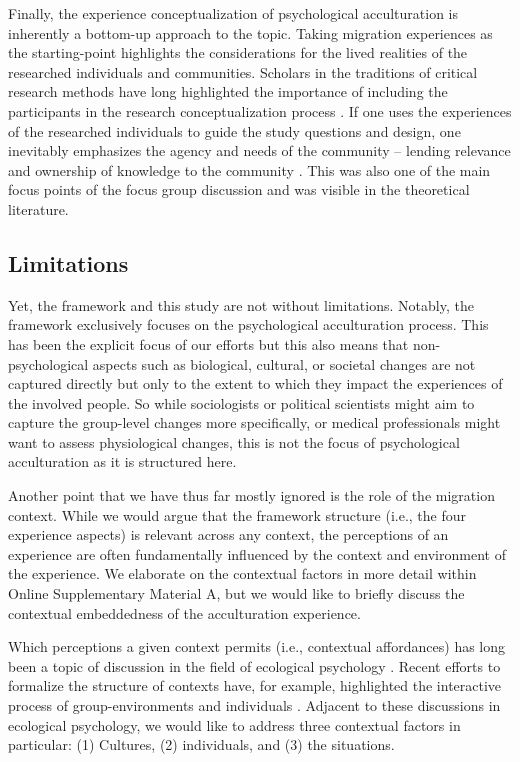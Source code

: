 \documentclass[man, 12pt, a4paper]{apa7}
\begin{document}
Finally, the experience conceptualization of psychological acculturation is inherently a bottom-up approach to the topic. Taking migration experiences as the starting-point highlights the considerations for the lived realities of the researched individuals and communities. Scholars in the traditions of critical research methods have long highlighted the importance of including the participants in the research conceptualization process \citep[e.g.,][]{Kovach2009}. If one uses the experiences of the researched individuals to guide the study questions and design, one inevitably emphasizes the agency and needs of the community -- lending relevance and ownership of knowledge to the community \citep[e.g., ][]{Schmidt2021}. This was also one of the main focus points of the focus group discussion and was visible in the theoretical literature.

\subsection{Limitations}
Yet, the framework and this study are not without limitations. Notably, the framework exclusively focuses on the psychological acculturation process. This has been the explicit focus of our efforts but this also means that non-psychological aspects such as biological, cultural, or societal changes are not captured directly but only to the extent to which they impact the experiences of the involved people. So while sociologists or political scientists might aim to capture the group-level changes more specifically, or medical professionals might want to assess physiological changes, this is not the focus of psychological acculturation as it is structured here. 

Another point that we have thus far mostly ignored is the role of the migration context. While we would argue that the framework structure (i.e., the four experience aspects) is relevant across any context, the perceptions of an experience are often fundamentally influenced by the context and environment of the experience. We elaborate on the contextual factors in more detail within Online Supplementary Material A, but we would like to briefly discuss the contextual embeddedness of the acculturation experience. 

Which perceptions a given context permits (i.e., contextual affordances) has long been a topic of discussion in the field of ecological psychology \citep[e.g., see][]{Cantor1994}. Recent efforts to formalize the structure of contexts have, for example, highlighted the interactive process of group-environments and individuals \citep[e.g.,][]{Young2002}.
Adjacent to these discussions in ecological psychology, we would like to address three contextual factors in particular: (1) Cultures, (2) individuals, and (3) the situations.
\end{document}
